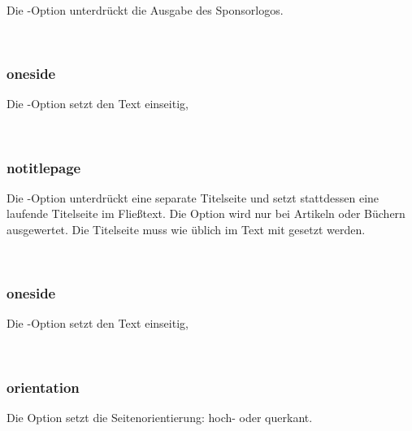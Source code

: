 Die -Option unterdrückt die Ausgabe des Sponsorlogos.

\begin{nutzung}
		\>\\
\end{nutzung}


\subsubsection{oneside}

Die -Option setzt den Text einseitig,

\begin{nutzung}
		\>\\
\end{nutzung}


\subsubsection{notitlepage}

Die -Option unterdrückt eine separate Titelseite und setzt stattdessen eine laufende Titelseite im Fließtext.
Die Option wird nur bei Artikeln oder Büchern ausgewertet.
Die Titelseite muss wie üblich im Text mit  gesetzt werden.

\begin{nutzung}
		\>\\
\end{nutzung}

\subsubsection{oneside}

Die -Option setzt den Text einseitig,

\begin{nutzung}
		\>\\
\end{nutzung}


\subsubsection{orientation}

Die Option  setzt die Seitenorientierung: hoch- oder querkant.

